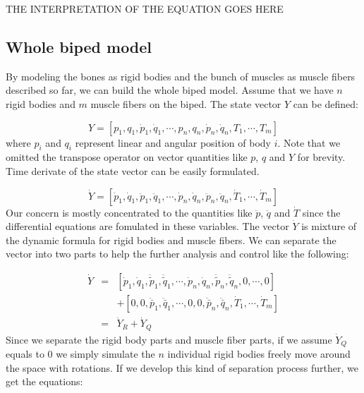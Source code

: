 \documentclass[a4paper,10pt]{article}
\begin{document}
THE INTERPRETATION OF THE EQUATION GOES HERE

\subsection{Whole biped model}

By modeling the bones as rigid bodies and the bunch of muscles as muscle
fibers described so far, we can build the whole biped model. Assume that
we have $n$ rigid bodies and $m$ muscle fibers on the biped. The state vector
$Y$ can be defined:

\begin{equation}
Y = [ p_1, q_1, \dot{p}_1, \dot{q}_1, \cdots ,
      p_n, q_n, \dot{p}_n, \dot{q}_n,
      T_1, \cdots, T_m]
\end{equation}
where $p_i$ and $q_i$ represent linear and angular position of body $i$.
Note that we omitted the transpose operator on vector quantities like $p$,
$q$ and $Y$ for brevity. Time derivate of the state vector can be easily
formulated.

\begin{equation}
\dot{Y} = [ \dot{p}_1, \dot{q}_1, \ddot{p}_1, \ddot{q}_1, \cdots ,
            \dot{p}_n, \dot{q}_n, \ddot{p}_n, \ddot{q}_n,
            \dot{T}_1, \cdots, \dot{T}_m]
\end{equation}
Our concern is mostly concentrated to the quantities like $\ddot{p}$,
$\ddot{q}$ and $\dot{T}$ since the differential equations are fomulated
in these variables. The vector $\dot{Y}$ is mixture
of the dynamic formula for rigid bodies and muscle fibers. We can separate
the vector into two parts to help the further analysis and control like the
following:

\begin{eqnarray*}\label{dotY1}
\dot{Y} & = & [ \dot{p}_1, \dot{q}_1, \ddot{\tilde{p}}_1, \ddot{\tilde{q}}_1, \cdots ,
                \dot{p}_n, \dot{q}_n, \ddot{\tilde{p}}_n, \ddot{\tilde{q}}_n,
                0, \cdots, 0] \\
        &   & + [ 0, 0, \ddot{\bar{p}}_1, \ddot{\bar{q}}_1, \cdots ,
                0, 0, \ddot{\bar{p}}_n, \ddot{\bar{q}}_n,
                \dot{T}_1, \cdots, \dot{T}_m]\\
        & = & \dot{Y}_R + \dot{Y}_Q
\end{eqnarray*}
Since we separate the rigid body parts and muscle fiber parts, if we
assume $\dot{Y}_Q$ equals to 0 we simply simulate the $n$ individual
rigid bodies freely move around the space with rotations. If we develop
this kind of separation process further, we get the equations:
\end{document}
